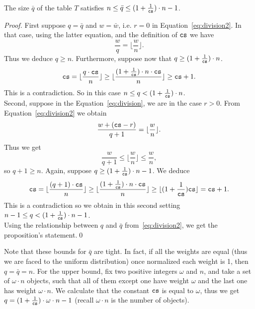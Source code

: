 \begin{proposition}
\label{prop:size_table}
    The size $\bar{q}$ of the table $T$ satisfies $n \leq \bar{q} \leq (1 + \frac{1}{\texttt{cs}})\cdot n -1$.
\end{proposition}
\begin{proof}
    First suppose $q = \bar{q}$ and $w = \bar{w}$, i.e. $r=0$ in Equation~\eqref{eq:division2}. In that case,
    using the latter equation, and the definition of $\texttt{cs}$ we have
    \[
        \frac{w}{q} = \lfloor \frac{w}{n} \rfloor.
    \]
    Thus we deduce $q \geq n$.
    Furthermore, suppose now that $q \geq (1 + \frac{1}{\texttt{cs}})\cdot n$.
    \[
        \texttt{cs} = \lfloor \frac{q\cdot \texttt{cs}}{n} \rfloor \geq \lfloor \frac{(1 + \frac{1}{\texttt{cs}})\cdot n \cdot \texttt{cs}}{n} \rfloor \geq \texttt{cs} +1.
    \]
    This is a contradiction.
    So in this case $n \leq q < (1 + \frac{1}{\texttt{cs}})\cdot n$.\\
    Second, suppose in the Equation~\eqref{eq:division}, we are in the case $r>0$. From Equation~\eqref{eq:division2}
    we obtain
    \[
        \frac{w + (\texttt{cs} - r)}{q+1} = \lfloor \frac{w}{n} \rfloor.
    \]
    Thus we get
    \[
        \frac{w}{q+1} \leq \lfloor \frac{w}{n} \rfloor \leq \frac{w}{n},
    \]   
    so $q+1\geq n$.
    Again, suppose $q \geq (1 + \frac{1}{\texttt{cs}})\cdot n -1$. We deduce
    \[
        \texttt{cs} = \lfloor \frac{(q+1)\cdot \texttt{cs}}{n} \rfloor \geq \lfloor \frac{ (1 + \frac{1}{\texttt{cs}})\cdot n \cdot \texttt{cs}}{n} \rfloor 
            \geq \lfloor (1 + \frac{1}{\texttt{cs}}) \texttt{cs} \rfloor = \texttt{cs} + 1.
    \]    
    This is a contradiction so we obtain in this second setting $n-1 \leq q < (1 + \frac{1}{\texttt{cs}})\cdot n-1$.\\
    Using the relationship between $q$ and $\bar{q}$ from~\eqref{eq:division2}, we get the proposition's statement.\qed
\end{proof}
Note that these bounds for $\bar{q}$ are tight. In fact, if all the weights are equal (thus we are faced to the uniform distribution)
once normalized each weight is 1, then $q=\bar{q} = n$.
For the upper bound, fix two positive integers $\omega$ and $n$, and take a set of $\omega \cdot n$ objects, such that
all of them except one have weight $\omega$ and the last one has weight $\omega\cdot n$.
We calculate that the constant $\texttt{cs}$ is equal to $\omega$, thus we get
$q = (1 + \frac{1}{\texttt{cs}})\cdot \omega\cdot n - 1$ (recall $\omega\cdot n$ is the number of objects).


